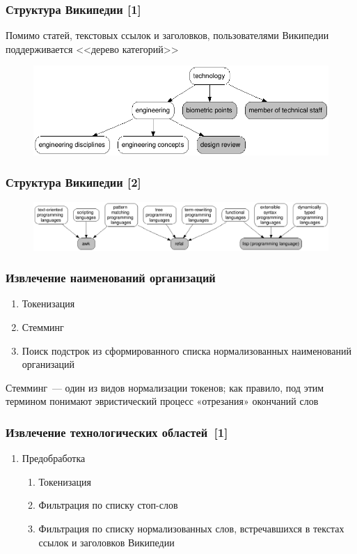 \documentclass{beamer}
\begin{document}
\begin{frame}\frametitle{Структура Википедии [1]}
Помимо статей, текстовых ссылок и заголовков, пользователями Википедии поддерживается <<дерево категорий>>

\begin{figure}[ht]
\begin{center}
\includegraphics[width=4.5in]{chart_categories.png}
\end{center}
\end{figure}

\end{frame}
\begin{frame}\frametitle{Структура Википедии [2]}

\begin{figure}[ht]
\begin{center}
\includegraphics[width=4.5in]{chart_languages.png}
\end{center}
\end{figure}
\end{frame}


\begin{frame}\frametitle{Извлечение наименований организаций}
\begin{enumerate}
\item Токенизация
\item Стемминг
\item Поиск подстрок из сформированного списка нормализованных наименований организаций
\end{enumerate}
Стемминг --- один из видов нормализации токенов; как правило, под этим термином понимают эвристический процесс «отрезания» окончаний слов
\end{frame}

\begin{frame}\frametitle{Извлечение технологических областей~[1]}
\begin{enumerate}
        \item Предобработка
        \begin{enumerate}
		\item Токенизация
		\item Фильтрация по списку стоп-слов
		\item Фильтрация по списку нормализованных слов, встречавшихся в текстах ссылок и заголовков Википедии
        \end{enumerate}
\end{enumerate}
\end{frame}
\end{document}
